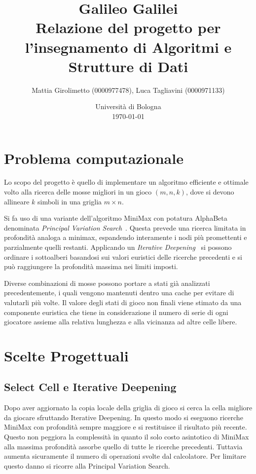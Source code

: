 \documentclass{article}
\title{Galileo Galilei \\
\large Relazione del progetto per l'insegnamento di Algoritmi e Strutture di Dati}
\author{
  Mattia Girolimetto (0000977478),
  Luca Tagliavini (0000971133)
}
\date{
	Universit\`a di Bologna \\
  \today
}
\begin{document}
\maketitle

\section{Problema computazionale}

Lo scopo del progetto \`e quello di implementare un algoritmo efficiente e ottimale
volto alla ricerca delle mosse migliori in un gioco $(m,n,k)$, dove si devono
allineare $k$ simboli in una griglia $m \times n$.

Si fa uso di una variante dell'algoritmo MiniMax con potatura
AlphaBeta denominata \emph{Principal Variation Search}~\cite{negascout}. Questa
prevede  una ricerca limitata in profondit\`a analoga a minimax, espandendo 
interamente i nodi pi\`u promettenti e parzialmente quelli restanti. Applicando
un \emph{Iterative Deepening}~\cite{id} si possono ordinare i sottoalberi
basandosi sui valori euristici delle ricerche precedenti e si pu\`o raggiungere
la profondit\`a massima nei limiti imposti.

Diverse combinazioni di mosse possono portare a stati gi\`a analizzati
precedentemente, i quali vengono mantenuti dentro una cache per evitare di
valutarli pi\`u volte. Il valore degli stati di gioco non finali viene stimato
da una componente euristica che tiene in considerazione il numero di serie di
ogni giocatore assieme alla relativa lunghezza e alla vicinanza ad altre celle
libere.

\section{Scelte Progettuali}

\subsection{Select Cell e Iterative Deepening}
Dopo aver aggiornato la copia locale della griglia di gioco si cerca la cella
migliore da giocare sfruttando Iterative Deepening. 
In questo modo si eseguono ricerche MiniMax con profondit\`a sempre maggiore
e si restituisce il risultato pi\`u recente. Questo non
peggiora la complessit\`a in quanto il solo costo asintotico di MiniMax alla
massima profondit\`a assorbe quello di tutte le ricerche precedenti.
Tuttavia aumenta sicuramente il numero di operazioni svolte dal calcolatore.
Per limitare questo danno si ricorre alla Principal Variation Search.
\end{document}
